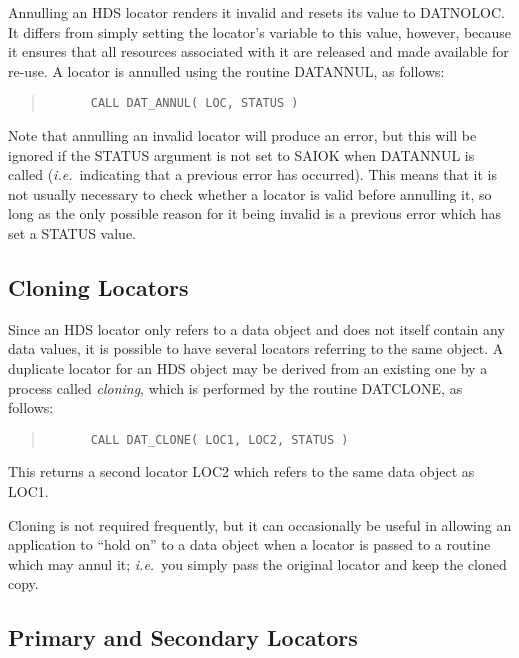 \documentclass[twoside,11pt]{article}
\newcommand{\htmlref}[2]{#1}
\newcommand{\xlabel}[1]{}
\renewcommand{\_}{\texttt{\symbol{95}}}
\newcommand{\qt}[1]{``#1''}
\newcommand{\st}[1]{{\em{#1}}}
\newcommand{\qt}[1]{{\tt{"}}#1{\tt{"}}}
\begin{document}
Annulling an HDS locator renders it invalid and resets its value to
DAT\_\_NOLOC.  It differs from simply setting the locator's variable
to this value, however, because it ensures that all resources
associated with it are released and made available for re-use. A
locator is annulled using the routine \htmlref{DAT\_ANNUL}{DAT_ANNUL},
as follows:

\small
\begin{quote}
\begin{verbatim}
      CALL DAT_ANNUL( LOC, STATUS )
\end{verbatim}
\end{quote}
\normalsize

Note that annulling an invalid locator will produce an error, but this
will be ignored if the STATUS argument is not set to SAI\_\_OK when
DAT\_ANNUL is called (\st{i.e.}\ indicating that a previous error has
occurred). This means that it is not usually necessary to check
whether a locator is valid before annulling it, so long as the only
possible reason for it being invalid is a previous error which has set
a STATUS value.

\subsection{\xlabel{cloning_locators}Cloning Locators}

Since an HDS locator only refers to a data object and does not itself
contain any data values, it is possible to have several locators
referring to the same object.  A duplicate locator for an HDS object
may be derived from an existing one by a process called \st{cloning},
which is performed by the routine \htmlref{DAT\_CLONE}{DAT_CLONE}, as
follows:

\small
\begin{quote}
\begin{verbatim}
      CALL DAT_CLONE( LOC1, LOC2, STATUS )
\end{verbatim}
\end{quote}
\normalsize

This returns a second locator LOC2 which refers to the same data
object as LOC1.

Cloning is not required frequently, but it can occasionally be useful
in allowing an application to \qt{hold on} to a data object when a
locator is passed to a routine which may \htmlref{annul}{sect:annul}
it; \st{i.e.}\ you simply pass the original locator and keep the
cloned copy.

\subsection{\xlabel{primary_and_secondary_locators}\label{sect:primary}Primary and Secondary Locators}
\end{document}
